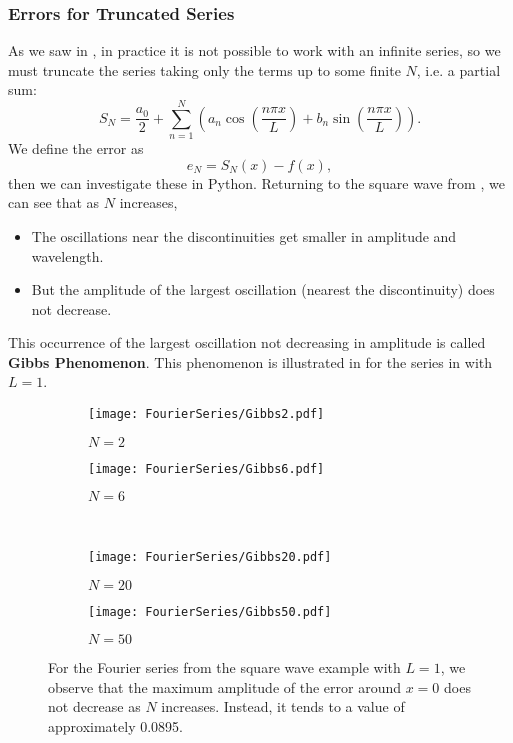 \subsubsection{Errors for Truncated Series}

As we saw in , in practice it is not possible to work with an infinite series, so we must truncate the series taking only the terms up to some finite $N$, i.e. a partial sum:
\[
S_N = \frac{a_0}{2} + \sum_{n=1}^N \left(a_n \cos{\left(\frac{n\pi x}{L}\right)} + b_n \sin{\left(\frac{n\pi x}{L}\right)}\right).
\]
We define the error as
\[
e_N = S_N(x) - f(x),
\]
then we can investigate these in Python. Returning to the square wave from , we can see that as $N$ increases,
\begin{itemize}
	\item The oscillations near the discontinuities get smaller in amplitude and wavelength.
	\item But the amplitude of the largest oscillation (nearest the discontinuity) does not decrease.
\end{itemize}

This occurrence of the largest oscillation not decreasing in amplitude is called \textbf{Gibbs Phenomenon}. This phenomenon is illustrated in  for the series in  with $L=1$.

\begin{figure}[!ht]
	\centering
	\begin{subfigure}[b]{0.49\textwidth}
		\centering
		\texttt{[image: FourierSeries/Gibbs2.pdf]}
		\caption{$N=2$}
	\end{subfigure}
	\hfill
	\begin{subfigure}[b]{0.49\textwidth}
		\centering
		\texttt{[image: FourierSeries/Gibbs6.pdf]}
		\caption{$N=6$}
	\end{subfigure}
	\\
	\begin{subfigure}[b]{0.49\textwidth}
		\centering
		\texttt{[image: FourierSeries/Gibbs20.pdf]}
		\caption{$N=20$}
	\end{subfigure}
	\hfill
	\begin{subfigure}[b]{0.49\textwidth}
		\centering
		\texttt{[image: FourierSeries/Gibbs50.pdf]}
		\caption{$N=50$}
	\end{subfigure}
	\caption{For the Fourier series from the square wave example with $L=1$, we observe that the maximum amplitude of the error around $x=0$ does not decrease as $N$ increases. Instead, it tends to a value of approximately 0.0895.\protect\footnotemark}
	\label{fig:gibbs}
\end{figure}

